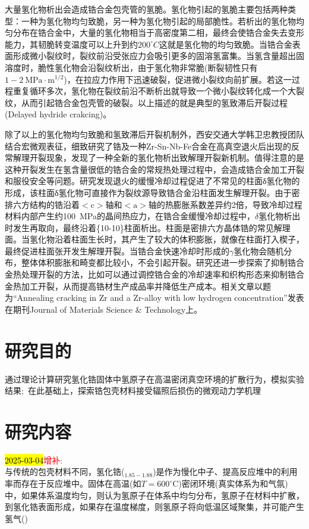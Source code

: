 大量氢化物析出会造成锆合金包壳管的氢脆。氢化物引起的氢脆主要包括两种类型：一种为氢化物均匀致脆，另一种为氢化物引起的局部脆性。若析出的氢化物均匀分布在锆合金中，大量的氢化物相当于高密度第二相，最终会使锆合金失去变形能力，其韧脆转变温度可以上升到约$200^{\circ}C$这就是氢化物的均匀致脆。当锆合金表面形成微小裂纹时，裂纹前沿受张应力会吸引更多的固溶氢富集。当氢含量超出固溶度时，脆性氢化物会沿裂纹析出，由于氢化物非常脆\textrm{(断裂韧性只有$1-2~\mathrm{MPa·m^{1/2}}$)}，在拉应力作用下迅速破裂，促进微小裂纹向前扩展。若这一过程重复循环多次，氢化物在裂纹前沿不断析出就导致一个微小裂纹转化成一个大裂纹，从而引起锆合金包壳管的破裂。以上描述的就是典型的氢致滞后开裂过程\textrm{(Delayed hydride crakcing)}。

除了以上的氢化物均匀致脆和氢致滞后开裂机制外，西安交通大学韩卫忠教授团队结合宏微观表征，细致研究了锆及一种\textrm{Zr-Sn-Nb-Fe}合金在高真空退火后出现的反常解理开裂现象，发现了一种全新的氢化物析出致解理开裂新机制。值得注意的是这种开裂发生在氢含量很低的锆合金的常规热处理过程中，会造成锆合金加工开裂和服役安全等问题。研究发现退火的缓慢冷却过程促进了不常见的柱面δ氢化物的形成，该柱面δ氢化物可直接作为裂纹源导致锆合金沿柱面发生解理开裂。由于密排六方结构的锆沿着$<\mathrm{c}>$轴和$<\mathrm{a}>$轴的热膨胀系数差异约2倍，导致冷却过程材料内部产生约\textrm{100~MPa}的晶间热应力，在锆合金缓慢冷却过程中，$\delta$氢化物析出时发生再取向，最终沿着\{10-10\}柱面析出。柱面是密排六方晶体锆的常见解理面。当氢化物沿着柱面生长时，其产生了较大的体积膨胀，就像在柱面打入楔子，最终促进柱面张开发生解理开裂。当锆合金快速冷却时形成的$\gamma$氢化物会随机分布，整体体积膨胀和畸变都比较小，不会引起开裂。研究还进一步探索了抑制锆合金热处理开裂的方法，比如可以通过调控锆合金的冷却速率和织构形态来抑制锆合金热加工开裂，从而提高锆材生产成品率并降低生产成本。相关文章以题为\textrm{``Annealing cracking in Zr and a Zr-alloy with low hydrogen concentration''}发表在期刊\textrm{Journal of Materials Science \& Technology}上。

\section{研究目的} 
通过理论计算研究氢化锆固体中氢原子在高温密闭真空环境的扩散行为，模拟实验结果;~在此基础上，探索锆包壳材料接受辐照后损伤的微观动力学机理

\section{研究内容}
\textcolor{red}{\hl{2025-03-04}增补:}~\\
与传统的包壳材料不同，氢化锆($_{1.85-1.88}$)是作为慢化中子、提高反应堆中的利用率而存在于反应堆中。固体在高温(如$T=600^{\circ}\mathrm{C}$)密闭环境(真实体系为和气氛)中，如果体系温度均匀，则认为氢原子在体系中均匀分布，氢原子在材料中扩散，到氢化锆表面形成，如果存在温度梯度，则氢原子将向低温区域聚集，并可能产生氢气()


